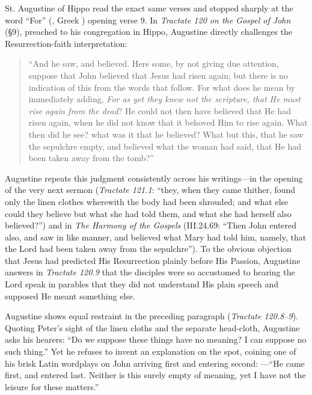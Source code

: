 St. Augustine of Hippo read the exact same verses and stopped sharply at the word ``For'' (, Greek ) opening verse 9. In \emph{Tractate 120 on the Gospel of John} (\S 9), preached to his congregation in Hippo, Augustine directly challenges the Resurrection-faith interpretation:
\begin{quote}
``And he saw, and believed. Here some, by not giving due attention, suppose that John believed that Jesus had risen again; but there is no indication of this from the words that follow. For what does he mean by immediately adding, \emph{For as yet they knew not the scripture, that He must rise again from the dead}? He could not then have believed that He had risen again, when he did not know that it behoved Him to rise again. What then did he see? what was it that he believed? What but this, that he saw the sepulchre empty, and believed what the woman had said, that He had been taken away from the tomb?''
\end{quote}

Augustine repeats this judgment consistently across his writings---in the opening of the very next sermon (\emph{Tractate 121.1}: ``they, when they came thither, found only the linen clothes wherewith the body had been shrouded; and what else could they believe but what she had told them, and what she had herself also believed?'') and in \emph{The Harmony of the Gospels} (III.24.69: ``Then John entered also, and saw in like manner, and believed what Mary had told him, namely, that the Lord had been taken away from the sepulchre''). To the obvious objection that Jesus had predicted His Resurrection plainly before His Passion, Augustine answers in \emph{Tractate 120.9} that the disciples were so accustomed to hearing the Lord speak in parables that they did not understand His plain speech and supposed He meant something else.

Augustine shows equal restraint in the preceding paragraph (\emph{Tractate 120.8--9}). Quoting Peter's sight of the linen cloths and the separate head-cloth, Augustine asks his hearers: ``Do we suppose these things have no meaning? I can suppose no such thing.'' Yet he refuses to invent an explanation on the spot, coining one of his brisk Latin wordplays on John arriving first and entering second: ---``He came first, and entered last. Neither is this surely empty of meaning, yet I have not the leisure for these matters.''

